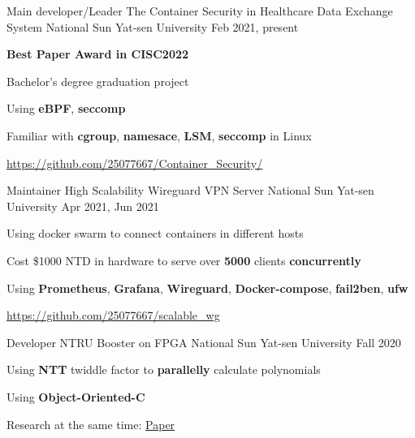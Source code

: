 \begin{cventries}
    \cventry
    {Main developer/Leader}
    {The Container Security in Healthcare Data Exchange System}
    {National Sun Yat-sen University} %
    {Feb 2021, present} %
    {
        \begin{cvitems} %
            \item {\textbf{Best Paper Award in CISC2022}}
            \item {Bachelor's degree graduation project}
			\item {Using \textbf{eBPF}, \textbf{seccomp}}
			\item {Familiar with \textbf{cgroup}, \textbf{namesace}, \textbf{LSM}, \textbf{seccomp} in Linux}
            \item {\url{https://github.com/25077667/Container_Security/}}
        \end{cvitems}
    }

    \cventry
    {Maintainer}
    {High Scalability Wireguard VPN Server}
    {National Sun Yat-sen University} %
    {Apr 2021, Jun 2021} %
    {
        \begin{cvitems} %
    		\item {Using docker swarm to connect containers in different hosts}
		    \item {Cost \$1000 NTD in hardware to serve over \textbf{5000} clients \textbf{concurrently}}
    		\item {Using \textbf{Prometheus}, \textbf{Grafana}, \textbf{Wireguard}, \textbf{Docker-compose}, \textbf{fail2ben}, \textbf{ufw}}
            \item {\url{https://github.com/25077667/scalable_wg}}
        \end{cvitems}
    }

    \cventry
    {Developer}
    {NTRU Booster on FPGA}
    {National Sun Yat-sen University} %
    {Fall 2020} %
    {
        \begin{cvitems} %
    		\item {Using \textbf{NTT} twiddle factor to \textbf{parallelly} calculate polynomials}
			\item{Using \textbf{Object-Oriented-C}}
            \item {Research at the same time: \href{http://dx.doi.org/10.6342/NTU202003012}{Paper}}
        \end{cvitems}
    }
\end{cventries}
